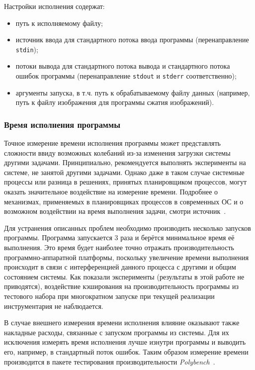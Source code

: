 \begin{samepage}
Настройки исполнения содержат:
\nopagebreak
\begin{itemize}
    \item путь к исполняемому файлу;
    \item источник ввода для стандартного потока ввода программы (перенаправление \texttt{stdin});
    \item потоки вывода для стандартного потока вывода и стандартного потока ошибок программы (перенаправление \texttt{stdout} и \texttt{stderr} соответственно);
    \item аргументы запуска, в т.ч. путь к обрабатываемому файлу данных (например, путь к файлу изображения для программы сжатия изображений).
\end{itemize}
\end{samepage}


\subsubsection{Время исполнения программы}
Точное измерение времени исполнения программы может представлять сложности ввиду возможных колебаний из-за изменения загрузки системы другими задачами. Принципиально, рекомендуется выполнять эксперименты на системе, не занятой другими задачами. Однако даже в таком случае системные процессы или разница в решениях, принятых планировщиком процессов, могут оказать значительное воздействие на измерение времени. Подробнее о механизмах, применяемых в планировщиках процессов в современных ОС и о возможном воздействии на время выполнения задачи, смотри источник~\cite{scheduling}.

Для устранения описанных проблем необходимо производить несколько запусков программы. Программа запускается 3 раза и берётся минимальное время её выполнения. Это время будет наиболее точно отражать производительность программно-аппаратной платформы, поскольку увеличение времени выполнения происходит в связи с интерференцией данного процесса с другими и общим состоянием системы. Как показали эксперименты (результаты в этой работе не приводятся), воздействие кэширования на производительность программы из тестового набора при многократном запуске при текущей реализации инструментария не наблюдается.

В случае внешнего измерения времени исполнения влияние оказывают также накладные расходы, связанные с запуском программы из системы. Для их исключения измерять время исполнения лучше изнутри программы и выводить его, например, в стандартный поток ошибок. Таким образом измерение времени производится в пакете тестирования производительности \textit{Polybench}~\cite{polybench}.

